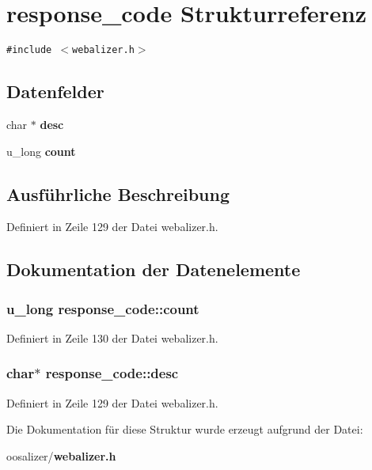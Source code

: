 \section{response\_\-code Strukturreferenz}
\label{structresponse__code}
{\tt \#include $<$webalizer.h$>$}

\subsection*{Datenfelder}
\begin{CompactItemize}
\item 
char $\ast$ {\bf desc}
\item 
u\_\-long {\bf count}
\end{CompactItemize}


\subsection{Ausf\"{u}hrliche Beschreibung}




Definiert in Zeile 129 der Datei webalizer.h.

\subsection{Dokumentation der Datenelemente}
\subsubsection{\setlength{\rightskip}{0pt plus 5cm}u\_\-long {\bf response\_\-code::count}}\label{structresponse__code_a973afefbe5e787ef2fee765f05bbfaf}




Definiert in Zeile 130 der Datei webalizer.h.
\subsubsection{\setlength{\rightskip}{0pt plus 5cm}char$\ast$ {\bf response\_\-code::desc}}\label{structresponse__code_c580ee9a4994223d0e663fa9a839ba0a}




Definiert in Zeile 129 der Datei webalizer.h.

Die Dokumentation f\"{u}r diese Struktur wurde erzeugt aufgrund der Datei:\begin{CompactItemize}
\item 
oosalizer/{\bf webalizer.h}\end{CompactItemize}
